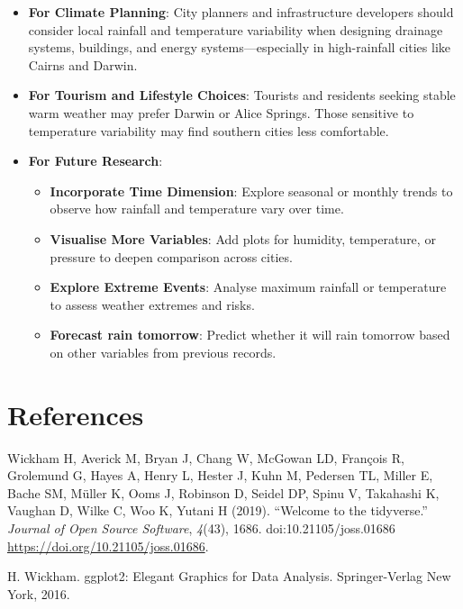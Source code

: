 \documentclass[
  letterpaper,
  DIV=11,
  numbers=noendperiod]{scrartcl}
\newenvironment{Shaded}{\begin{snugshade}}{\end{snugshade}}
\begin{document}
\begin{Shaded}
\begin{Highlighting}[]
\begin{Shaded}
\begin{Highlighting}[]
\begin{Shaded}
\begin{Highlighting}[]
\begin{Shaded}
\begin{Highlighting}[]
\begin{itemize}
\item
  \textbf{For Climate Planning}: City planners and infrastructure
  developers should consider local rainfall and temperature variability
  when designing drainage systems, buildings, and energy
  systems---especially in high-rainfall cities like Cairns and Darwin.
\item
  \textbf{For Tourism and Lifestyle Choices}: Tourists and residents
  seeking stable warm weather may prefer Darwin or Alice Springs. Those
  sensitive to temperature variability may find southern cities less
  comfortable.
\item
  \textbf{For Future Research}:

  \begin{itemize}
  \item
    \textbf{Incorporate Time Dimension}: Explore seasonal or monthly
    trends to observe how rainfall and temperature vary over time.
  \item
    \textbf{Visualise More Variables}: Add plots for humidity,
    temperature, or pressure to deepen comparison across cities.
  \item
    \textbf{Explore Extreme Events}: Analyse maximum rainfall or
    temperature to assess weather extremes and risks.
  \item
    \textbf{Forecast rain tomorrow}: Predict whether it will rain
    tomorrow based on other variables from previous records.
  \end{itemize}
\end{itemize}

\section{References}\label{references}

Wickham H, Averick M, Bryan J, Chang W, McGowan LD, François R,
Grolemund G, Hayes A, Henry L, Hester J, Kuhn M, Pedersen TL, Miller E,
Bache SM, Müller K, Ooms J, Robinson D, Seidel DP, Spinu V, Takahashi K,
Vaughan D, Wilke C, Woo K, Yutani H (2019). ``Welcome to the
tidyverse.'' \emph{Journal of Open Source Software}, \emph{4}(43), 1686.
doi:10.21105/joss.01686 \url{https://doi.org/10.21105/joss.01686}.

H. Wickham. ggplot2: Elegant Graphics for Data Analysis. Springer-Verlag
New York, 2016.


\end{Highlighting}
\end{Shaded}
\end{Highlighting}
\end{Shaded}
\end{Highlighting}
\end{Shaded}
\end{Highlighting}
\end{Shaded}
\end{document}
